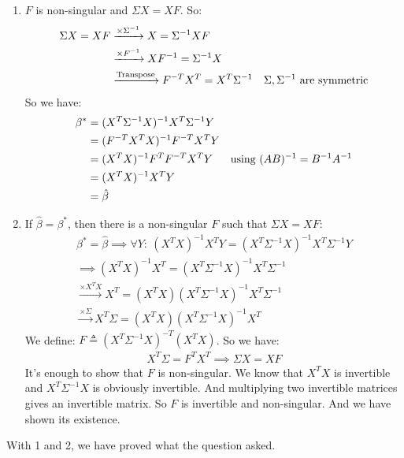 \documentclass[]{article}
\numberwithin{equation}{section}
\newcommand{\transpose}{^T}
\newcommand{\inverse}{^{-1}}
\begin{document}
\subsection{}
\begin{enumerate}
\item \(F\) is non-singular and \(\Sigma X = X F\). So:
\begin{align}
\Sigma X = X F &\xrightarrow{\times \Sigma^{-1}} X = \Sigma^{-1} X F \\
&\xrightarrow{\times F^{-1}} XF^{-1} = \Sigma^{-1} X\\
&\xrightarrow{\textup{Transpose}} F^{-T}X\transpose = X\transpose \Sigma^{-1} & \Sigma,\Sigma^{-1} \textup{ are symmetric}
\end{align}
So we have:
\begin{align}
\beta^* &= (X\transpose \Sigma^{-1} X)^{-1} X\transpose \Sigma^{-1} Y\\
& = (F^{-T}X\transpose X)\inverse F^{-T}X\transpose Y\\
& = (X\transpose X)^{-1}F^{T} F^{-T} X\transpose Y & \textup{using } (AB)\inverse = B\inverse A\inverse \\
& = (X\transpose X)^{-1} X\transpose Y\\
& = \hat{\beta}
\end{align}
\item If \(\hat{\beta} = \beta^*\), then there is a non-singular \(F\) such that \(\Sigma X = X F\):
\begin{gather}
\beta^* = \hat{\beta} \implies \forall Y:\ (X\transpose X)\inverse X\transpose Y = (X\transpose \Sigma^{-1} X)^{-1} X\transpose \Sigma^{-1} Y\\
\implies (X\transpose X)\inverse X\transpose = (X\transpose \Sigma^{-1} X)^{-1} X\transpose \Sigma^{-1}\\
\xrightarrow{\times X\transpose X} X\transpose = (X\transpose X) (X\transpose \Sigma^{-1} X)^{-1} X\transpose \Sigma^{-1}\\
\xrightarrow{\times \Sigma} X\transpose \Sigma = (X\transpose X) (X\transpose \Sigma^{-1} X)^{-1} X\transpose
\end{gather}
We define:
\(F \triangleq (X\transpose \Sigma^{-1} X)^{-T}(X\transpose X)\).
So we have:
\begin{gather}
X\transpose \Sigma = F\transpose X\transpose \implies \Sigma X = X F
\end{gather}
It's enough to show that \(F\) is non-singular. We know that \(X\transpose X\) is invertible and \(X\transpose \Sigma^{-1} X\) is obviously invertible.
And multiplying two invertible matrices gives an invertible matrix.
So \(F\) is invertible and non-singular. And we have shown its existence.
\end{enumerate}
With 1 and 2, we have proved what the question asked.
\end{document}
